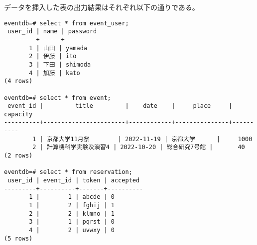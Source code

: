 \documentclass[dvipdfmx]{jarticle}
\begin{document}
データを挿入した表の出力結果はそれぞれ以下の通りである。

\begin{lstlisting}[caption=insertion\_result]
eventdb=# select * from event_user;
 user_id | name | password
---------+------+----------
       1 | 山田 | yamada
       2 | 伊藤 | ito
       3 | 下田 | shimoda
       4 | 加藤 | kato
(4 rows)

eventdb=# select * from event;
 event_id |         title         |    date    |     place     | capacity
----------+-----------------------+------------+---------------+----------
        1 | 京都大学11月祭        | 2022-11-19 | 京都大学      |     1000
        2 | 計算機科学実験及演習4 | 2022-10-20 | 総合研究7号館 |       40
(2 rows)

eventdb=# select * from reservation;
 user_id | event_id | token | accepted
---------+----------+-------+----------
       1 |        1 | abcde | 0
       1 |        2 | fghij | 1
       2 |        2 | klmno | 1
       3 |        1 | pqrst | 0
       4 |        2 | uvwxy | 0
(5 rows)
\end{lstlisting}
\end{document}
